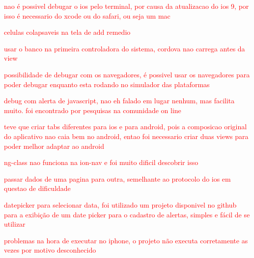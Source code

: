 \textcolor{red}{nao é possivel debugar o ios pelo terminal, por causa da atualizacao do ios 9, por isso é necessario do xcode ou do safari, ou seja um mac}


\textcolor{red}{celulas colapsaveis na tela de add remedio}


\textcolor{red}{usar o banco na primeira controladora do sistema, cordova nao carrega antes da view}


\textcolor{red}{possibilidade de debugar com os navegadores, é possivel usar os navegadores para poder debugar enquanto esta rodando no simulador das plataformas}


\textcolor{red}{debug com alerta de javascript, nao eh falado em lugar nenhum, mas facilita muito. foi encontrado por pesquisas na comunidade on line}


\textcolor{red}{teve que criar tabs diferentes para ios e para android, pois a composicao original do aplicativo nao caia bem no android, entao foi necessario criar duas views para poder melhor adaptar ao android}


\textcolor{red}{ng-class nao funciona na ion-nav e foi muito dificil descobrir isso}


\textcolor{red}{passar dados de uma pagina para outra, semelhante ao protocolo do ios em questao de dificuldade}


\textcolor{red}{datepicker para selecionar data, foi utilizado um projeto disponivel no github para a exibição de um date picker para o cadastro de alertas, simples e fácil de se utilizar}


\textcolor{red}{problemas na hora de executar no iphone, o projeto não executa corretamente as vezes por motivo desconhecido}

